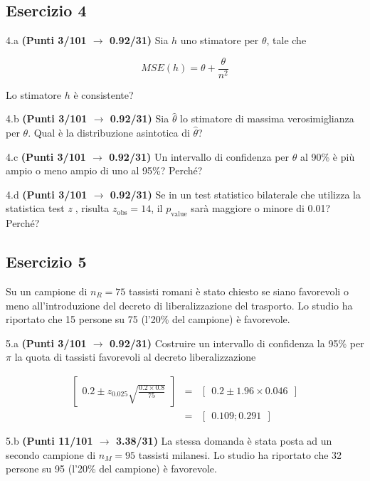 \documentclass[
  11pt,
]{book}
\theoremstyle{mytheoremstyle}
\theoremstyle{mydefstyle}
\newenvironment{sol}
  {
  \begin{tcolorbox}[enhanced,breakable,arc=0.1mm,boxrule=1pt,colback=white,colframe=iblue,
  title=\bf \fontfamily{lmss}\selectfont \hspace{.5 cm} Soluzione,drop fuzzy shadow]

}{
\end{tcolorbox}
  }
\begin{document}
\subsection{Esercizio 4}\label{esercizio-4-18}

4.a \textbf{(Punti 3/101 \(\rightarrow\) 0.92/31)} Sia \(h\) uno stimatore per \(\theta\), tale che

\[
MSE(h) =  \theta+\frac{\theta}{n^2}
\]

Lo stimatore \(h\) è consistente?

4.b \textbf{(Punti 3/101 \(\rightarrow\) 0.92/31)} Sia \(\hat\theta\) lo stimatore di massima verosimiglianza
per \(\theta\). Qual è la distribuzione asintotica di \(\hat\theta\)?

4.c \textbf{(Punti 3/101 \(\rightarrow\) 0.92/31)} Un intervallo di confidenza per \(\theta\) al 90\% è più ampio o meno ampio di uno al 95\%? Perché?

4.d \textbf{(Punti 3/101 \(\rightarrow\) 0.92/31)} Se in un test statistico bilaterale che utilizza la statistica test \emph{z} , risulta \(z_\text{obs}=14\), il \(p_\text{value}\) sarà maggiore o minore di 0.01? Perché?

\subsection{Esercizio 5}\label{esercizio-5-16}

Su un campione di \(n_R=75\) tassisti romani è stato chiesto se siano favorevoli o meno all'introduzione
del decreto di liberalizzazione del trasporto. Lo studio ha riportato che 15 persone su 75 (l'20\% del campione) è favorevole.

5.a \textbf{(Punti 3/101 \(\rightarrow\) 0.92/31)} Costruire un intervallo di confidenza la 95\% per \(\pi\) la quota di tassisti favorevoli al decreto liberalizzazione

\begin{sol}
\begin{eqnarray*}
  \left[~~0.2\pm z_{0.025}\sqrt{\frac{0.2\times 0.8}{75}}~~\right] &=&
  \left[~~0.2\pm 1.96\times0.046~~\right]\\
  &=&\left[~~0.109; 0.291~~\right]
\end{eqnarray*}

\end{sol}

5.b \textbf{(Punti 11/101 \(\rightarrow\) 3.38/31)} La stessa domanda è stata posta ad un secondo
campione di \(n_M=95\) tassisti milanesi. Lo studio ha riportato che 32 persone su 95 (l'20\% del campione) è favorevole.
\end{document}
